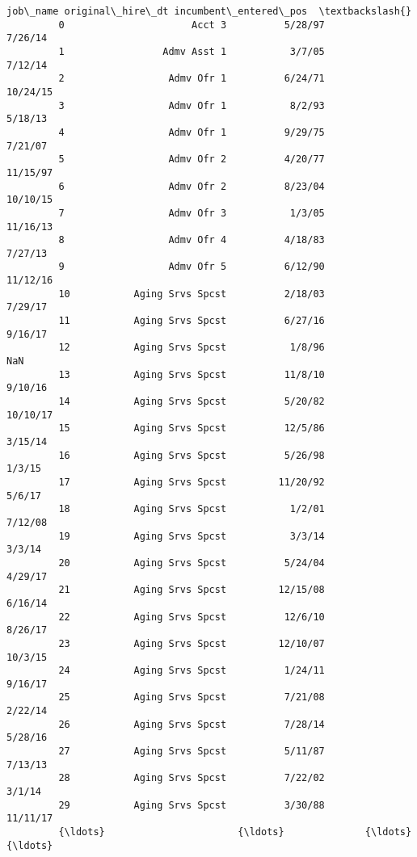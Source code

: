 \documentclass[11pt]{article}
\begin{document}
\begin{Verbatim}[commandchars=\\\{\}]
                              job\_name original\_hire\_dt incumbent\_entered\_pos  \textbackslash{}
         0                      Acct 3          5/28/97               7/26/14   
         1                 Admv Asst 1           3/7/05               7/12/14   
         2                  Admv Ofr 1          6/24/71              10/24/15   
         3                  Admv Ofr 1           8/2/93               5/18/13   
         4                  Admv Ofr 1          9/29/75               7/21/07   
         5                  Admv Ofr 2          4/20/77              11/15/97   
         6                  Admv Ofr 2          8/23/04              10/10/15   
         7                  Admv Ofr 3           1/3/05              11/16/13   
         8                  Admv Ofr 4          4/18/83               7/27/13   
         9                  Admv Ofr 5          6/12/90              11/12/16   
         10           Aging Srvs Spcst          2/18/03               7/29/17   
         11           Aging Srvs Spcst          6/27/16               9/16/17   
         12           Aging Srvs Spcst           1/8/96                   NaN   
         13           Aging Srvs Spcst          11/8/10               9/10/16   
         14           Aging Srvs Spcst          5/20/82              10/10/17   
         15           Aging Srvs Spcst          12/5/86               3/15/14   
         16           Aging Srvs Spcst          5/26/98                1/3/15   
         17           Aging Srvs Spcst         11/20/92                5/6/17   
         18           Aging Srvs Spcst           1/2/01               7/12/08   
         19           Aging Srvs Spcst           3/3/14                3/3/14   
         20           Aging Srvs Spcst          5/24/04               4/29/17   
         21           Aging Srvs Spcst         12/15/08               6/16/14   
         22           Aging Srvs Spcst          12/6/10               8/26/17   
         23           Aging Srvs Spcst         12/10/07               10/3/15   
         24           Aging Srvs Spcst          1/24/11               9/16/17   
         25           Aging Srvs Spcst          7/21/08               2/22/14   
         26           Aging Srvs Spcst          7/28/14               5/28/16   
         27           Aging Srvs Spcst          5/11/87               7/13/13   
         28           Aging Srvs Spcst          7/22/02                3/1/14   
         29           Aging Srvs Spcst          3/30/88              11/11/17   
         {\ldots}                       {\ldots}              {\ldots}                   {\ldots}   

\end{Verbatim}
\end{document}
